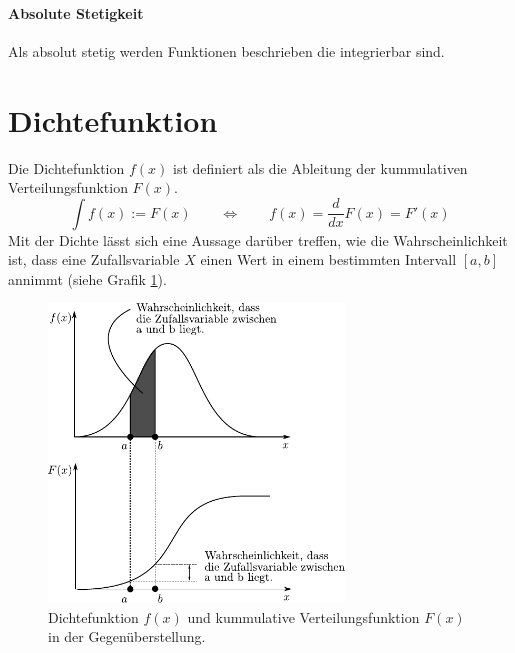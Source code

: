 \paragraph{Absolute Stetigkeit}
Als absolut stetig werden Funktionen beschrieben die integrierbar 
sind. 

\newpage

\section{Dichtefunktion}
Die Dichtefunktion $f(x)$ ist definiert als die Ableitung der kummulativen
Verteilungsfunktion $F(x)$.
\[  
	\int f(x) := F(x) 
		\qquad 
		\Leftrightarrow 
		\qquad 
		f(x) = \frac{d}{dx} F(x)
		= F'(x)
\]
Mit der Dichte lässt sich eine Aussage darüber treffen, wie die 
Wahrscheinlichkeit ist, dass eine Zufallsvariable $X$ einen Wert
in einem bestimmten Intervall $[a,b]$ annimmt (siehe Grafik 
\ref{fig:dichte}).

\begin{figure}[h!]
	\centering
	\includegraphics[width=0.7\textwidth]{dichtefunktion.pdf}
	\caption{Dichtefunktion $f(x)$ und kummulative Verteilungsfunktion 
		$F(x)$ in der Gegenüberstellung.}
	\label{fig:dichte}
\end{figure}

